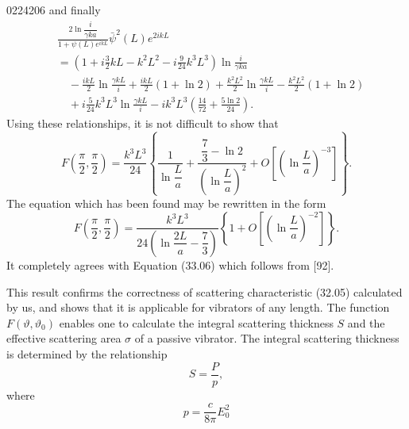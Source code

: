 \begin{scanpage}{0224}{206}
\noindent and finally
\[\begin{aligned}
&\frac{2\ln\dfrac{i}{\gamma ka}}{1+\psi(L)e^{ikL}}\bar\psi^2(L)e^{2ikL}\\
&=\left(1+i\frac32kL-k^2L^2-i\frac9{24}k^3L^3\right)\ln\frac{i}{\gamma ka}\\
&\quad-\frac{ikL}2\ln\frac{\gamma kL}i+\frac{ikL}2(1+\ln2)+\frac{k^2L^2}2\ln\frac{\gamma kL}i-\frac{k^2L^2}2(1+\ln2)\\
&\quad+i\frac5{24}k^3L^3\ln\frac{\gamma kL}i-ik^3L^3\left(\frac{14}{72}+\frac{5\ln2}{24}\right).
\end{aligned}\tag{33.16}\]
Using these relationships, it is not difficult to show that
\[F\left(\frac\pi2,\frac\pi2\right)=\frac{k^3L^3}{24}\left\{\frac1{\ln\dfrac La}+\frac{\dfrac73-\ln2}{\left(\ln\dfrac La\right)^2}+O\left[\left(\ln\frac La\right)^{-3}\right]\right\}.\tag{33.17}\]
The equation which has been found may be rewritten in the form
\[F\left(\frac\pi2,\frac\pi2\right)=\frac{k^3L^3}{24\left(\ln\dfrac{2L}a-\dfrac73\right)}\left\{1+O\left[\left(\ln\frac La\right)^{-2}\right]\right\}.\tag{33.18}\]
It completely agrees with Equation (33.06) which follows from [92].

This result confirms the correctness of scattering characteristic (32.05) calculated by us, and shows that it is applicable for vibrators of any length.
The function $F(\vartheta,\vartheta_0)$ enables one to calculate the integral scattering thickness $S$ and the effective scattering area $\sigma$ of a passive vibrator. The integral scattering thickness is determined by the relationship
\[S=\frac Pp,\tag{34.01}\]
where
\[p=\frac{c}{8\pi}E_0^2\tag{34.02}\]
\end{scanpage}
